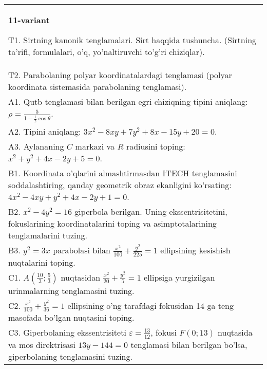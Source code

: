 \documentclass{article}
\begin{document}
\begin{tabular}{m{17cm}}
\textbf{11-variant}
\newline

T1. Sirtning kanonik tenglamalari. Sirt haqqida tushuncha. (Sirtning ta'rifi, formulalari, o'q, yo'naltiruvchi to'g'ri chiziqlar).\\

T2. Parabolaning polyar koordinatalardagi tenglamasi (polyar koordinata sistemasida parabolaning tenglamasi).\\

A1. Qutb tenglamasi bilan berilgan egri chiziqning tipini aniqlang: $\rho=\frac{5}{1-\frac{1}{2}\cos\theta}$.\\

A2. Tipini aniqlang: $3x^{2}-8xy+7y^{2}+8x-15y+20=0$.\\

A3. Aylananing $C$ markazi va $R$ radiusini toping: $x^2+y^2+4x-2y+5=0$.\\

B1. Koordinata o'qlarini almashtirmasdan ITECH tenglamasini soddalashtiring, qanday geometrik obraz ekanligini ko'rsating: $4x^{2} - 4xy + y^{2} + 4x - 2y + 1 = 0$.  \\

B2. $x^{2} - 4y^{2} = 16$ giperbola berilgan. Uning ekssentrisitetini, fokuslarining koordinatalarini toping va asimptotalarining tenglamalarini tuzing.\\

B3. $y^{2} = 3x$ parabolasi bilan $\frac{x^{2}}{100} + \frac{y^{2}}{225} = 1$ ellipsining kesishish nuqtalarini toping.  \\

C1. $A(\frac{10}{3};\frac{5}{3})$ nuqtasidan $\frac{x^{2}}{20} + \frac{y^{2}}{5} = 1$ ellipsiga yurgizilgan urinmalarning tenglamasini tuzing.  \\

C2. $\frac{x^{2}}{100} + \frac{y^{2}}{36} = 1$ ellipsining o'ng tarafdagi fokusidan 14 ga teng masofada bo'lgan nuqtasini toping.  \\

C3. Giperbolaning ekssentrisiteti $\varepsilon = \frac{13}{12}$, fokusi $F(0;13)$ nuqtasida va mos direktrisasi $13y - 144 = 0$ tenglamasi bilan berilgan bo'lsa, giperbolaning tenglamasini tuzing.  \\

\end{tabular}
\vspace{1cm}
\end{document}
